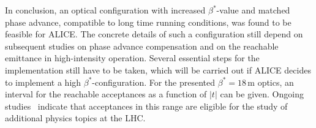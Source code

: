 In conclusion, an optical configuration with increased $\beta^*$-value and matched phase advance, compatible to long time running conditions, was found to be feasible for ALICE. The concrete details of such a configuration still depend on subsequent studies on phase advance compensation and on the reachable emittance in high-intensity operation. 
Several essential steps for the implementation still have to be taken, which will be carried out if ALICE decides to implement a high $\beta^*$-configuration.
For the presented $\beta^*=18\,$m optics, an interval for the reachable acceptances as a function of $|t|$ can be given. Ongoing studies~\cite{schicker_unpublished} indicate that acceptances in this range are eligible for the study of additional physics topics at the LHC. 
 